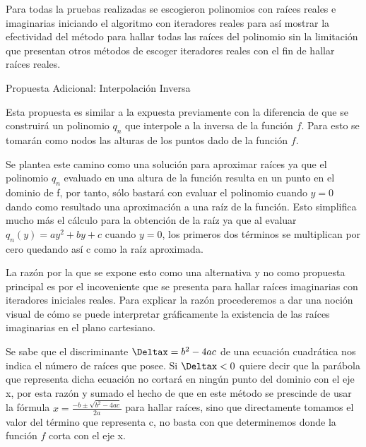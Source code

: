 \documentclass[11pt]{article}
\begin{document}
Para todas la pruebas realizadas se escogieron polinomios con raíces reales e imaginarias iniciando el algoritmo con iteradores reales para así mostrar la efectividad del método para hallar todas las raíces del polinomio sin la limitación que presentan otros métodos de escoger iteradores reales con el fin de hallar raíces reales.

\vspace{0.75cm}

\begin{center} \large  {Propuesta Adicional: Interpolación Inversa} \end{center}

Esta propuesta es similar a la expuesta previamente con la diferencia de que se construirá un polinomio $q_n$ que interpole a la inversa de la función $f$. Para esto se tomarán como nodos las alturas de los puntos dado de la función $f$.

Se plantea este camino como una solución para aproximar raíces ya que el polinomio $q_n$ evaluado en una altura de la función resulta en un punto en el dominio de f, por tanto, sólo bastará con evaluar el polinomio cuando $y = 0$ dando como resultado una aproximación a una raíz de la función. Esto simplifica mucho más el cálculo para la obtención de la raíz ya que al evaluar $q_n(y) = ay^2 + by + c$ cuando $y=0$, los primeros dos términos se multiplican por cero quedando así c como la raíz aproximada.



La razón por la que se expone esto como una alternativa y no como propuesta principal es por el incoveniente que se presenta para hallar raíces imaginarias con iteradores iniciales reales. Para explicar la razón procederemos a dar una noción visual de cómo se puede interpretar gráficamente la existencia de las raíces imaginarias en el plano cartesiano.

Se sabe que el discriminante $\Deltax = b^2 - 4ac$ de una ecuación cuadrática nos indica el número de raíces que posee. Si $\Deltax < 0$ quiere decir que la parábola que representa dicha ecuación no cortará en ningún punto del dominio con el eje x, por esta razón y sumado el hecho de que en este método se prescinde de usar la fórmula $x = \frac{-b \pm \sqrt{b^2 - 4ac}}{2a}$ para hallar raíces, sino que directamente tomamos el valor del término que representa c, no basta con que determinemos donde la función $f$ corta con el eje x.
 
\end{document}
